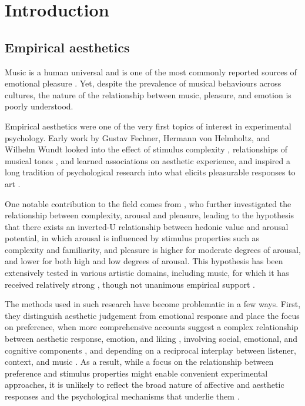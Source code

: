 
\chapter{Introduction}
\label{ch:1}

\section{Empirical aesthetics}

Music is a human universal \parencite{mehr2019, savage2015} and is one of the most commonly reported sources of emotional pleasure \parencite{dube2003}. Yet, despite the prevalence of musical behaviours across cultures, the nature of the relationship between music, pleasure, and emotion is poorly understood. 

Empirical aesthetics were one of the very first topics of interest in experimental psychology. Early work by Gustav Fechner, Hermann von Helmholtz, and Wilhelm Wundt looked into the effect of stimulus complexity \parencite{wundt1863}, relationships of musical tones \parencite{helmholtz1863}, and learned associations \parencite{fechner1876} on aesthetic experience, and inspired a long tradition of psychological research into what elicits pleasurable responses to art \parencite[for a review, see][]{huron2016}. 

One notable contribution to the field comes from \textcite{berlyne1971}, who further investigated the relationship between complexity, arousal and pleasure, leading to the hypothesis that there exists an inverted-U relationship between hedonic value and arousal potential, in which arousal is influenced by stimulus properties such as complexity and familiarity, and pleasure is higher for moderate degrees of arousal, and lower for both high and low degrees of arousal. This hypothesis has been extensively tested in various artistic domains, including music, for which it has received relatively strong \parencite[e.g][]{heyduk1975, north1995, vitz1966}, though not unanimous \parencite[e.g.][]{orr2005, smith1990} empirical support \parencite[for reviews, see][]{chmiel2017, hargreaves2010, orr2005}.

The methods used in such research have become problematic in a few ways. First, they distinguish aesthetic judgement from emotional response \parencite{orr2005} and place the focus on preference, when more comprehensive accounts suggest a complex relationship between aesthetic response, emotion, and liking \parencite{juslin2010}, involving social, emotional, and cognitive components \parencite{konecni1979}, and depending on a reciprocal interplay between listener, context, and music \parencite{gabrielsson2001b, hargreaves2012}. As a result, while a focus on the relationship between preference and stimulus properties might enable convenient experimental approaches, it is unlikely to reflect the broad nature of affective and aesthetic responses and the psychological mechanisms that underlie them \parencite{huron2016, juslin2016}.

